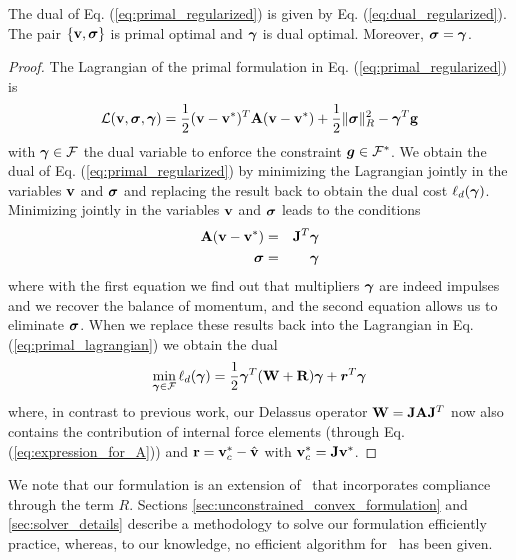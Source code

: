 \begin{theorem}
The dual of Eq. (\ref{eq:primal_regularized}) is given by Eq.
(\ref{eq:dual_regularized}). The pair $\{{\mathbf{v}},{\bm\sigma}\}$ is primal optimal and
${\bm\gamma}$ is dual optimal. Moreover, ${\bm\sigma} = {\bm\gamma}$.
\end{theorem}

\begin{proof}
The Lagrangian of the primal formulation in Eq. (\ref{eq:primal_regularized}) is
\begin{equation}
	\mathcal{L}(\mf{v},\bsigma,\vf{\gamma}) = \frac{1}{2}(\mf{v}-\mf{v}^*)^T\mf{A}(\mf{v}-\mf{v}^*) + \frac{1}{2} \Vert\bsigma\Vert_{R}^2 - \vf{\gamma}^T\mf{g}
	\label{eq:primal_lagrangian}
\end{equation}
with ${\bm{\gamma}}\in\mathcal{F}$ the dual variable to enforce the constraint
${\bm{g}}\in \mathcal{F}^*$. We obtain the dual of Eq.
(\ref{eq:primal_regularized}) by minimizing the Lagrangian jointly in the
variables ${\mathbf{v}}$ and ${\bm\sigma}$ and replacing the result back to obtain the
dual cost $\ell_d({\bm{\gamma}})$. Minimizing jointly in the variables ${\mathbf{v}}$
and ${\bm\sigma}$ leads to the conditions
\begin{eqnarray}
	{\mathbf{A}}({\mathbf{v}}-{\mathbf{v}}^*) &=& {\mathbf{J}}^T{\bm{\gamma}}\\
	{\bm{\sigma}} &=& {\bm{\gamma}}
\end{eqnarray}
where with the first equation we find out that multipliers ${\bm\gamma}$ are indeed
impulses and we recover the balance of momentum, and the second equation allows
us to eliminate ${\bm{\sigma}}$. When we replace these results back into the
Lagrangian in Eq. (\ref{eq:primal_lagrangian}) we obtain the dual
\begin{eqnarray}
	\min_{{\bm\gamma}\in \mathcal{F}} \ell_d({\bm\gamma}) =
	\frac{1}{2}{\bm\gamma}^T(\mathbf{W}+\mathbf{R}){\bm\gamma} + {\bm r}^T
	{\bm\gamma}
\end{eqnarray}
where, in contrast to previous work, our Delassus operator
${\mathbf{W}}={\mathbf{J}}{\mathbf{A}}{\mathbf{J}}^T$ now also contains the contribution of internal
force elements (through Eq. (\ref{eq:expression_for_A})) and
${\mathbf{r}}={\mathbf{v}}_c^*-\hat{{\mathbf{v}}}$ with ${\mathbf{v}}_c^*={\mathbf{J}}{\mathbf{v}}^*$.
\end{proof}

We note that our formulation is an extension of~\cite{bib:mazhar2014} that
incorporates  compliance through the term $R$. Sections
\ref{sec:unconstrained_convex_formulation} and \ref{sec:solver_details} 
describe a methodology to solve our formulation efficiently practice, whereas,
to our knowledge, no efficient algorithm for~\cite{bib:mazhar2014} has been given. 






